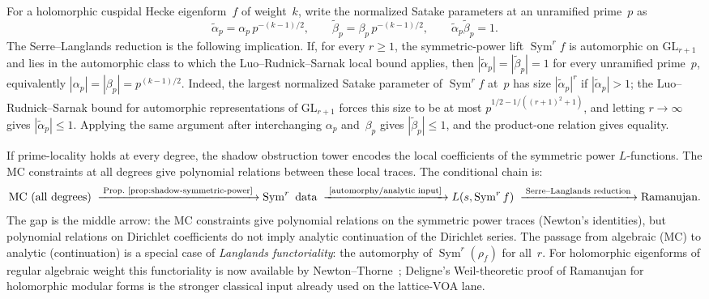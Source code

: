 \begin{remark}%
\label{rem:serre-reduction}%
%
%
For a holomorphic cuspidal Hecke eigenform~$f$ of weight~$k$,
write the normalized Satake parameters at an unramified prime~$p$ as
\[
\widetilde\alpha_p=\alpha_p\,p^{-(k-1)/2},\qquad
\widetilde\beta_p=\beta_p\,p^{-(k-1)/2},
\qquad
\widetilde\alpha_p\widetilde\beta_p=1 .
\]
The Serre--Langlands reduction
\cite{Serre1968Abelian,Langlands1970Problems,LuoRudnickSarnak1999}
is the following implication.  If, for every $r\geq 1$, the
symmetric-power lift $\operatorname{Sym}^r f$ is automorphic on
$\mathrm{GL}_{r+1}$ and lies in the automorphic class to which the
Luo--Rudnick--Sarnak local bound applies, then
$|\widetilde\alpha_p|=|\widetilde\beta_p|=1$ for every unramified
prime~$p$, equivalently
$|\alpha_p|=|\beta_p|=p^{(k-1)/2}$.
Indeed, the largest normalized Satake parameter of
$\operatorname{Sym}^r f$ at~$p$ has size
$|\widetilde\alpha_p|^r$ if $|\widetilde\alpha_p|>1$; the
Luo--Rudnick--Sarnak bound for automorphic representations of
$\mathrm{GL}_{r+1}$ forces this size to be at most
$p^{1/2-1/((r+1)^2+1)}$, and letting $r\to\infty$ gives
$|\widetilde\alpha_p|\leq 1$. Applying the same argument after
interchanging $\alpha_p$ and~$\beta_p$ gives
$|\widetilde\beta_p|\leq1$, and the product-one relation gives
equality.

If prime-locality holds at every degree, the shadow obstruction tower
encodes the local coefficients of the symmetric power $L$-functions.
The MC constraints at all degrees give polynomial relations between
these local traces. The conditional chain is:
\[
\text{MC (all degrees)}
\;\xrightarrow{\;\text{Prop.~\ref{prop:shadow-symmetric-power}}\;}
\operatorname{Sym}^r \text{ data}
\;\xrightarrow{\;\text{[automorphy/analytic input]}\;}
L(s,\operatorname{Sym}^r f)
\;\xrightarrow{\;\text{Serre--Langlands reduction}\;}
\text{Ramanujan.}
\]
The gap is the middle arrow: the MC constraints give polynomial
relations on the symmetric power traces
(Newton's identities), but polynomial relations on
Dirichlet coefficients do not imply analytic continuation of
the Dirichlet series. The passage from algebraic (MC) to
analytic (continuation) is a special case of
\emph{Langlands functoriality}: the automorphy of
$\operatorname{Sym}^r(\rho_f)$ for all~$r$.  For holomorphic
eigenforms of regular algebraic weight this functoriality is now
available by Newton--Thorne~\cite{NewtonThorne2021}; Deligne's
Weil-theoretic proof of Ramanujan for holomorphic modular forms
\cite{Deligne1974} is the stronger classical input already used on
the lattice-VOA lane.
\end{remark}

